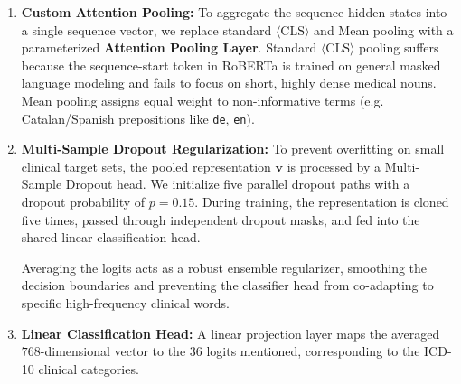 \documentclass{article}
\begin{document}
\begin{enumerate}
    \item \textbf{Custom Attention Pooling:} To aggregate the sequence hidden states into a single sequence vector, we replace standard $\langle\text{CLS}\rangle$ and Mean pooling with a parameterized \textbf{Attention Pooling Layer}. Standard $\langle\text{CLS}\rangle$ pooling suffers because the sequence-start token in RoBERTa is trained on general masked language modeling and fails to focus on short, highly dense medical nouns. Mean pooling assigns equal weight to non-informative terms (e.g. Catalan/Spanish prepositions like \texttt{de}, \texttt{en}). 
    
    \item \textbf{Multi-Sample Dropout Regularization:} To prevent overfitting on small clinical target sets, the pooled representation $\mathbf{v}$ is processed by a Multi-Sample Dropout head. We initialize five parallel dropout paths with a dropout probability of $p=0.15$. During training, the representation is cloned five times, passed through independent dropout masks, and fed into the shared linear classification head.
    
    Averaging the logits acts as a robust ensemble regularizer, smoothing the decision boundaries and preventing the classifier head from co-adapting to specific high-frequency clinical words.
    
    \item \textbf{Linear Classification Head:} A linear projection layer maps the averaged $768$-dimensional vector to the $36$ logits mentioned, corresponding to the ICD-10 clinical categories.
\end{enumerate}
\vspace{\baselineskip}
\end{document}
